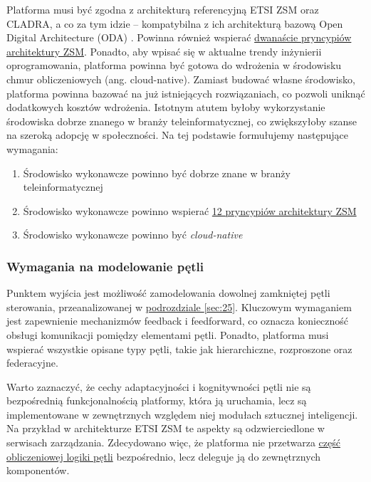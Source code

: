 Platforma musi być zgodna z architekturą referencyjną ETSI ZSM oraz CLADRA, a co za tym idzie – kompatybilna z ich architekturą bazową Open Digital Architecture (ODA) \cite{tmforum2018}. Powinna również wspierać \hyperlink{sec:zsm}{dwanaście pryncypiów architektury ZSM}. Ponadto, aby wpisać się w aktualne trendy inżynierii oprogramowania, platforma powinna być gotowa do wdrożenia w środowisku chmur obliczeniowych (ang. cloud-native). Zamiast budować własne środowisko, platforma powinna bazować na już istniejących rozwiązaniach, co pozwoli uniknąć dodatkowych kosztów wdrożenia. Istotnym atutem byłoby wykorzystanie środowiska dobrze znanego w branży teleinformatycznej, co zwiększyłoby szanse na szeroką adopcję w społeczności. Na tej podstawie formułujemy następujące wymagania:

\begin{enumerate}
    \setcounter{enumi}{0} 
    \item \label{req:1} Środowisko wykonawcze powinno być dobrze znane w branży teleinformatycznej
    \item \label{req:2} Środowisko wykonawcze powinno wspierać \hyperlink{list:2}{12 pryncypiów architektury ZSM}
    \item \label{req:3} Środowisko wykonawcze powinno być \textit{cloud-native}
\end{enumerate}

\subsubsection{Wymagania na modelowanie pętli}

Punktem wyjścia jest możliwość zamodelowania dowolnej zamkniętej pętli sterowania, przeanalizowanej w \hyperlink{sec:25}{podrozdziale \ref{sec:25}}. Kluczowym wymaganiem jest zapewnienie mechanizmów feedback i feedforward, co oznacza konieczność obsługi komunikacji pomiędzy elementami pętli. Ponadto, platforma musi wspierać wszystkie opisane typy pętli, takie jak hierarchiczne, rozproszone oraz federacyjne.

Warto zaznaczyć, że cechy adaptacyjności i kognitywności pętli nie są bezpośrednią funkcjonalnością platformy, która ją uruchamia, lecz są implementowane w zewnętrznych względem niej modułach sztucznej inteligencji. Na przykład w architekturze ETSI ZSM te aspekty są odzwierciedlone w serwisach zarządzania. Zdecydowano więc, że platforma nie przetwarza \hyperlink{def:czesc-obliczeniowa}{część obliczeniowej logiki pętli} bezpośrednio, lecz deleguje ją do zewnętrznych komponentów.


